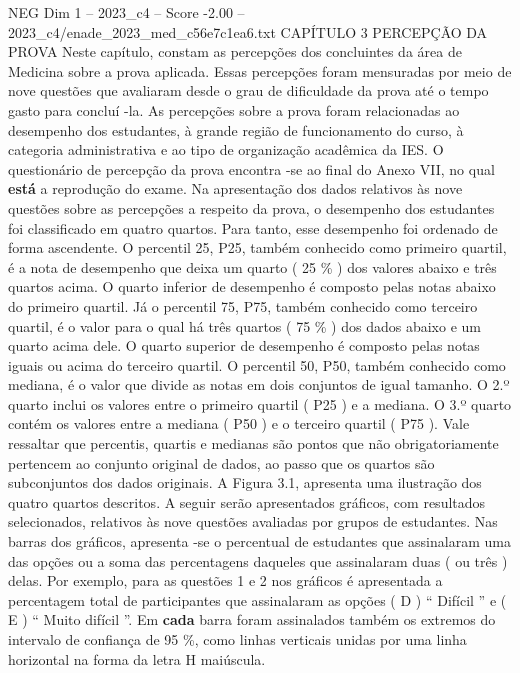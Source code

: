 \begin{textsample}{NEG Dim 1 – 2023\_c4 – Score -2.00 – 2023\_c4/enade\_2023\_med\_c56e7c1ea6.txt}  \label{ex:f1_neg_248}
CAPÍTULO 3 PERCEPÇÃO DA PROVA Neste capítulo, constam as percepções dos concluintes da área de Medicina sobre a prova aplicada.
Essas percepções foram mensuradas por meio de nove questões que avaliaram desde o grau de dificuldade da prova até o tempo gasto para concluí -la.
As percepções sobre a prova foram relacionadas ao desempenho dos estudantes, à grande região de funcionamento do curso, à categoria administrativa e ao tipo de organização acadêmica da IES.
O questionário de percepção da prova encontra -se ao final do Anexo VII, no qual \textbf{está} a reprodução do exame.
Na apresentação dos dados relativos às nove questões sobre as percepções a respeito da prova, o desempenho dos estudantes foi classificado em quatro quartos.
Para tanto, esse desempenho foi ordenado de forma ascendente.
O percentil 25, P25, também conhecido como primeiro quartil, é a nota de desempenho que deixa um quarto ( 25 \% ) dos valores abaixo e três quartos acima.
O quarto inferior de desempenho é composto pelas notas abaixo do primeiro quartil.
Já o percentil 75, P75, também conhecido como terceiro quartil, é o valor para o qual há três quartos ( 75 \% ) dos dados abaixo e um quarto acima dele.
O quarto superior de desempenho é composto pelas notas iguais ou acima do terceiro quartil.
O percentil 50, P50, também conhecido como mediana, é o valor que divide as notas em dois conjuntos de igual tamanho.
O 2.º quarto inclui os valores entre o primeiro quartil ( P25 ) e a mediana.
O 3.º quarto contém os valores entre a mediana ( P50 ) e o terceiro quartil ( P75 ).
Vale ressaltar que percentis, quartis e medianas são pontos que não obrigatoriamente pertencem ao conjunto original de dados, ao passo que os quartos são subconjuntos dos dados originais.
A Figura 3.1, apresenta uma ilustração dos quatro quartos descritos.
A seguir serão apresentados gráficos, com resultados selecionados, relativos às nove questões avaliadas por grupos de estudantes.
Nas barras dos gráficos, apresenta -se o percentual de estudantes que assinalaram uma das opções ou a soma das percentagens daqueles que assinalaram duas ( ou três ) delas.
Por exemplo, para as questões 1 e 2 nos gráficos é apresentada a percentagem total de participantes que assinalaram as opções ( D ) “ Difícil ” e ( E ) “ Muito difícil ”.
Em \textbf{cada} barra foram assinalados também os extremos do intervalo de confiança de 95 \%, como linhas verticais unidas por uma linha horizontal na forma da letra H maiúscula.

\end{textsample}
